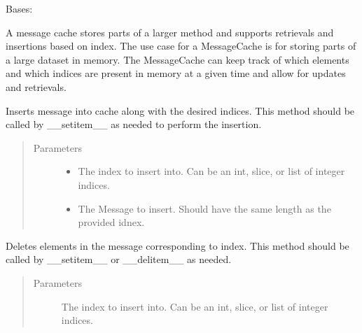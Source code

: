 \documentclass[letterpaper,10pt,english]{sphinxmanual}
\begin{document}
\begin{fulllineitems}
\label{\detokenize{Fireworks:Fireworks.core.cache.MessageCache}}
Bases: 

A message cache stores parts of a larger method and supports retrievals and
insertions based on index.
The use case for a MessageCache is for storing parts of a large dataset in memory.
The MessageCache can keep track of which elements and which indices are present
in memory at a given time and allow for updates and retrievals.

\begin{fulllineitems}
\label{\detokenize{Fireworks:Fireworks.core.cache.MessageCache.insert}}
Inserts message into cache along with the desired indices.
This method should be called by \_\_setitem\_\_ as needed to perform the insertion.
\begin{quote}\begin{description}
\item[{Parameters}] \leavevmode\begin{itemize}
\item {} 
 \textendash{} The index to insert into. Can be an int, slice, or list of integer indices.

\item {} 
 \textendash{} The Message to insert. Should have the same length as the provided idnex.

\end{itemize}

\end{description}\end{quote}

\end{fulllineitems}


\begin{fulllineitems}
\label{\detokenize{Fireworks:Fireworks.core.cache.MessageCache.delete}}
Deletes elements in the message corresponding to index.
This method should be called by \_\_setitem\_\_ or \_\_delitem\_\_ as needed.
\begin{quote}\begin{description}
\item[{Parameters}] \leavevmode
{} \textendash{} The index to insert into. Can be an int, slice, or list of integer indices.


\end{description}
\end{quote}
\end{fulllineitems}
\end{fulllineitems}
\end{document}

